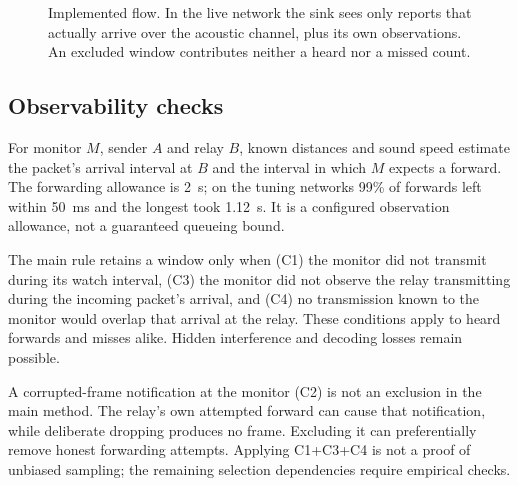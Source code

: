 \documentclass{article}
\begin{document}
\begin{figure}[H]\centering{}
\caption{Implemented flow. In the live network the sink sees only reports that actually arrive over the acoustic channel, plus its own observations. An excluded window contributes neither a heard nor a missed count.}\label{fig:framework}
\end{figure}

\subsection{Observability checks}
For monitor $M$, sender $A$ and relay $B$, known distances and sound speed estimate the packet's arrival interval at $B$ and the interval in which $M$ expects a forward. The forwarding allowance is 2~s; on the tuning networks 99\% of forwards left within 50~ms and the longest took 1.12~s. It is a configured observation allowance, not a guaranteed queueing bound.

The main rule retains a window only when (C1) the monitor did not transmit during its watch interval, (C3) the monitor did not observe the relay transmitting during the incoming packet's arrival, and (C4) no transmission known to the monitor would overlap that arrival at the relay. These conditions apply to heard forwards and misses alike. Hidden interference and decoding losses remain possible.

A corrupted-frame notification at the monitor (C2) is not an exclusion in the main method. The relay's own attempted forward can cause that notification, while deliberate dropping produces no frame. Excluding it can preferentially remove honest forwarding attempts. Applying C1+C3+C4 is not a proof of unbiased sampling; the remaining selection dependencies require empirical checks.
\end{document}
